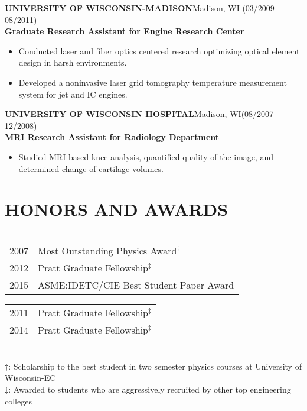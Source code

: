 \documentclass[11pt,letterpaper]{article}
\begin{document}
\MakeUppercase{\bf University of Wisconsin-Madison}\hfill{Madison, WI}{ (03/2009 - 08/2011)}\\
{\bf Graduate Research Assistant for Engine Research Center}
\begin{itemize}
\item Conducted laser and fiber optics centered research optimizing optical element design in harsh environments. 
\item Developed a noninvasive laser grid tomography temperature measurement system for jet and IC engines.
\end{itemize}

\MakeUppercase{\bf University of Wisconsin Hospital}\hfill{Madison, WI}{ {(08/2007 - 12/2008)}}\\
{\bf MRI Research Assistant for Radiology Department}
\begin{itemize}
\item Studied MRI-based knee analysis, quantified quality of the image, and determined change of cartilage volumes.
\end{itemize}

\vspace{-5mm}
\section*{HONORS AND AWARDS}\vspace{-3mm}
\hrule
\hspace{0mm}
\begin{minipage}{\columnwidth}
\begin{minipage}{0.5\columnwidth}
\begin{tabular}{l l}
2007 & Most Outstanding Physics Award$^\dagger$ \\
2012 & Pratt Graduate Fellowship$^\ddagger$\\
2015 & ASME:IDETC/CIE Best Student Paper Award\\
\end{tabular}
\end{minipage}
\hfill
\begin{minipage}{0.4\columnwidth}
\begin{tabular}{l l}
2011 & Pratt Graduate Fellowship$^\ddagger$ \\
2014 & Pratt Graduate Fellowship$^\ddagger$\\ 
\end{tabular}
\end{minipage}
\\
\vspace{5mm}
$\dagger$: Scholarship to the best student in two semester physics courses at University of Wisconsin-EC\\
$\ddagger$: Awarded to students who are aggressively recruited by other top engineering colleges\\
\end{minipage}
\end{document}
